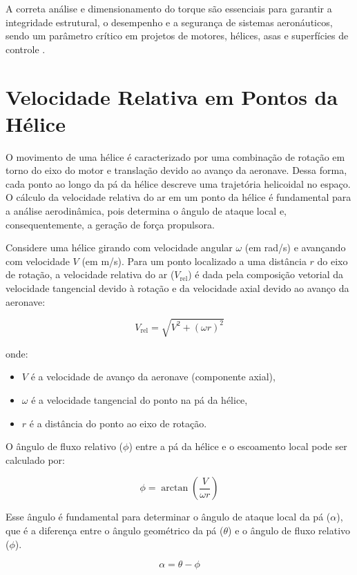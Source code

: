 A correta análise e dimensionamento do torque são essenciais para garantir a integridade estrutural, o desempenho e a segurança de sistemas aeronáuticos, sendo um parâmetro crítico em projetos de motores, hélices, asas e superfícies de controle \cite{anderson2017fundamentals, raymer2018aircraft}.

\section{Velocidade Relativa em Pontos da Hélice}
O movimento de uma hélice é caracterizado por uma combinação de rotação em torno do eixo do motor e translação devido ao avanço da aeronave. Dessa forma, cada ponto ao longo da pá da hélice descreve uma trajetória helicoidal no espaço. O cálculo da velocidade relativa do ar em um ponto da hélice é fundamental para a análise aerodinâmica, pois determina o ângulo de ataque local e, consequentemente, a geração de força propulsora.

Considere uma hélice girando com velocidade angular \(\omega\) (em rad/s) e avançando com velocidade \(V\) (em m/s). Para um ponto localizado a uma distância \(r\) do eixo de rotação, a velocidade relativa do ar (\(V_{\text{rel}}\)) é dada pela composição vetorial da velocidade tangencial devido à rotação e da velocidade axial devido ao avanço da aeronave:

\[
V_{\text{rel}} = \sqrt{V^2 + (\omega r)^2}
\]

onde:
\begin{itemize}
    \item \(V\) é a velocidade de avanço da aeronave (componente axial),
    \item \(\omega\) é a velocidade tangencial do ponto na pá da hélice,
    \item \(r\) é a distância do ponto ao eixo de rotação.
\end{itemize}

O ângulo de fluxo relativo (\(\phi\)) entre a pá da hélice e o escoamento local pode ser calculado por:

\[
\phi = \arctan\left(\frac{V}{\omega r}\right)
\]

Esse ângulo é fundamental para determinar o ângulo de ataque local da pá (\(\alpha\)), que é a diferença entre o ângulo geométrico da pá (\(\theta\)) e o ângulo de fluxo relativo (\(\phi\)).

\[
\alpha = \theta - \phi
\]

